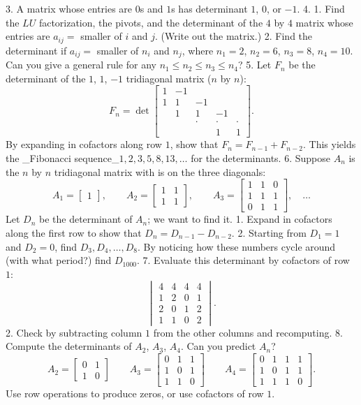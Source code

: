 3. A matrix whose entries are \(0\)s and \(1\)s has determinant \(1\), \(0\), or \(-1\).
4. 1. Find the \(LU\) factorization, the pivots, and the determinant of the \(4\) by \(4\) matrix whose entries are \(a_{ij}=\) smaller of \(i\) and \(j\). (Write out the matrix.) 2. Find the determinant if \(a_{ij}=\) smaller of \(n_{i}\) and \(n_{j}\), where \(n_{1}=2\), \(n_{2}=6\), \(n_{3}=8\), \(n_{4}=10\). Can you give a general rule for any \(n_{1}\leq n_{2}\leq n_{3}\leq n_{4}\)?
5. Let \(F_{n}\) be the determinant of the \(1\), \(1\), \(-1\) tridiagonal matrix (\(n\) by \(n\)): \[F_{n}=\det\begin{bmatrix}1&-1&&&\\ 1&1&-1&&\\ &1&1&-1&\\ &&\cdot&\cdot&\cdot\\ &&&1&1\end{bmatrix}.\] By expanding in cofactors along row \(1\), show that \(F_{n}=F_{n-1}+F_{n-2}\). This yields the _Fibonacci sequence_\(1,2,3,5,8,13,\ldots\) for the determinants.
6. Suppose \(A_{n}\) is the \(n\) by \(n\) tridiagonal matrix with is on the three diagonals: \[A_{1}=\begin{bmatrix}1\end{bmatrix},\qquad A_{2}=\begin{bmatrix}1&1\\ 1&1\end{bmatrix},\qquad A_{3}=\begin{bmatrix}1&1&0\\ 1&1&1\\ 0&1&1\end{bmatrix},\quad\ldots\] Let \(D_{n}\) be the determinant of \(A_{n}\); we want to find it. 1. Expand in cofactors along the first row to show that \(D_{n}=D_{n-1}-D_{n-2}\). 2. Starting from \(D_{1}=1\) and \(D_{2}=0\), find \(D_{3},D_{4},\ldots,D_{8}\). By noticing how these numbers cycle around (with what period?) find \(D_{1000}\).
7. Evaluate this determinant by cofactors of row \(1\): \[\begin{vmatrix}4&4&4&4\\ 1&2&0&1\\ 2&0&1&2\\ 1&1&0&2\end{vmatrix}.\] 2. Check by subtracting column \(1\) from the other columns and recomputing.
8. Compute the determinants of \(A_{2}\), \(A_{3}\), \(A_{4}\). Can you predict \(A_{n}\)? \[A_{2}=\begin{bmatrix}0&1\\ 1&0\end{bmatrix}\qquad A_{3}=\begin{bmatrix}0&1&1\\ 1&0&1\\ 1&1&0\end{bmatrix}\qquad A_{4}=\begin{bmatrix}0&1&1&1\\ 1&0&1&1\\ 1&1&1&0\end{bmatrix}.\] Use row operations to produce zeros, or use cofactors of row \(1\).

 